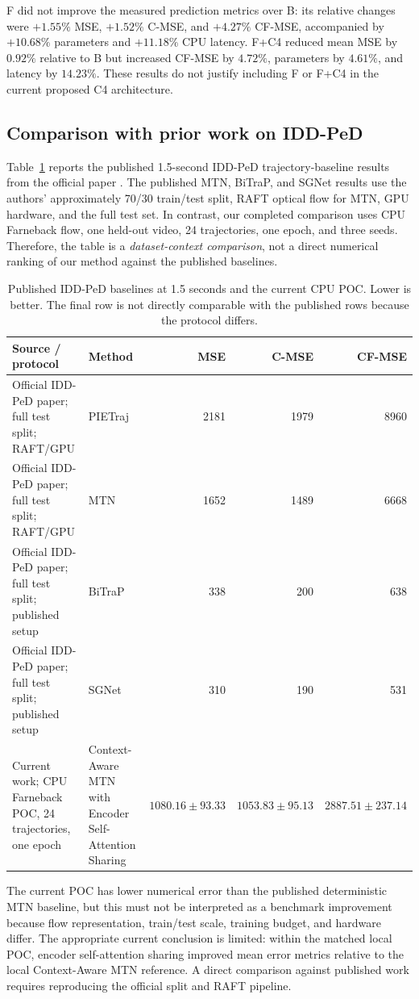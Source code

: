 F did not improve the measured prediction metrics over B: its relative changes were $+1.55\%$ MSE, $+1.52\%$ C-MSE, and $+4.27\%$ CF-MSE, accompanied by $+10.68\%$ parameters and $+11.18\%$ CPU latency. F+C4 reduced mean MSE by $0.92\%$ relative to B but increased CF-MSE by $4.72\%$, parameters by $4.61\%$, and latency by $14.23\%$. These results do not justify including F or F+C4 in the current proposed C4 architecture.

\subsection{Comparison with prior work on IDD-PeD}
Table~\ref{tab:prior} reports the published 1.5-second IDD-PeD trajectory-baseline results from the official paper \cite{iddped2025}. The published MTN, BiTraP, and SGNet results use the authors' approximately 70/30 train/test split, RAFT optical flow for MTN, GPU hardware, and the full test set. In contrast, our completed comparison uses CPU Farneback flow, one held-out video, 24 trajectories, one epoch, and three seeds. Therefore, the table is a \emph{dataset-context comparison}, not a direct numerical ranking of our method against the published baselines.

\begin{table}[t]
\centering
\scriptsize
\caption{Published IDD-PeD baselines at 1.5 seconds and the current CPU POC. Lower is better. The final row is not directly comparable with the published rows because the protocol differs.}
\label{tab:prior}
\setlength{\tabcolsep}{3pt}
\begin{tabular}{p{}p{}rrr}
\toprule
Source / protocol & Method & MSE & C-MSE & CF-MSE\\
\midrule
Official IDD-PeD paper; full test split; RAFT/GPU & PIETraj & 2181 & 1979 & 8960\\
Official IDD-PeD paper; full test split; RAFT/GPU & MTN & 1652 & 1489 & 6668\\
Official IDD-PeD paper; full test split; published setup & BiTraP & 338 & 200 & 638\\
Official IDD-PeD paper; full test split; published setup & SGNet & 310 & 190 & 531\\
\midrule
Current work; CPU Farneback POC, 24 trajectories, one epoch & Context-Aware MTN with Encoder Self-Attention Sharing & $1080.16\pm93.33$ & $1053.83\pm95.13$ & $2887.51\pm237.14$\\
\bottomrule
\end{tabular}
\end{table}

The current POC has lower numerical error than the published deterministic MTN baseline, but this must not be interpreted as a benchmark improvement because flow representation, train/test scale, training budget, and hardware differ. The appropriate current conclusion is limited: within the matched local POC, encoder self-attention sharing improved mean error metrics relative to the local Context-Aware MTN reference. A direct comparison against published work requires reproducing the official split and RAFT pipeline.
